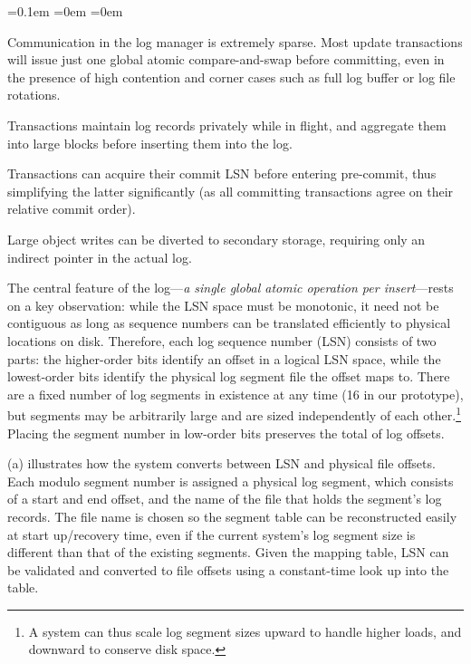 \setcounter{mycounter}{0}
\begin{list}{.}{\leftmargin=1.4em}
  \itemsep=0.1em
  \parsep=0em
  \parskip=0em
\item Communication in the log manager is extremely sparse. Most update transactions will issue just one global atomic compare-and-swap before committing, even in the presence of high contention and corner cases such as full log buffer or log file rotations.
\item Transactions maintain log records privately while in flight, and aggregate them into large blocks before inserting them into the log.
\item Transactions can acquire their commit LSN before entering pre-commit, thus simplifying the latter significantly (as all committing transactions agree on their relative commit order).
\item Large object writes can be diverted to secondary storage, requiring only an indirect pointer in the actual log.
\end{list}

The central feature of the log---{\em a single global atomic operation per insert}---rests on a key observation: while the LSN space must be monotonic, it need not be contiguous as long as sequence numbers can be translated efficiently to physical locations on disk. Therefore, each log sequence number (LSN) consists of two parts: the higher-order bits identify an offset in a logical LSN space, while the lowest-order bits identify the physical log segment file the offset maps to. There are a fixed number of log segments in existence at any time (16 in our prototype), but segments may be arbitrarily large and are sized independently of each other.\footnote{A system can thus scale log segment sizes upward to handle higher loads, and downward to conserve disk space.} Placing the segment number in low-order bits preserves the total of log offsets.


(a) illustrates how the system converts between LSN and physical file offsets. Each modulo segment number is assigned a physical log segment, which consists of a start and end offset, and the name of the file that holds the segment's log records. The file name is chosen so the segment table can be reconstructed easily at start up/recovery time, even if the current system's log segment size is different than that of the existing segments. Given the mapping table, LSN can be validated and converted to file offsets using a constant-time look up into the table.

